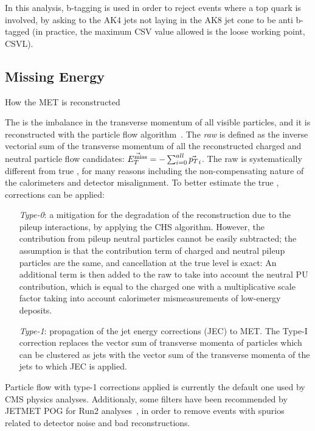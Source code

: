 In this analysis, b-tagging is used in order to reject events where a top quark is involved, by asking to the AK4 jets not laying in the AK8 jet cone to be anti b-tagged (in practice, the maximum CSV value allowed is the loose working point, CSVL).

\subsection{Missing Energy}
{\color{red} How the MET is reconstructed}
 
The \MET is the imbalance in the transverse momentum of all visible particles, and it is reconstructed with the particle flow algorithm~\cite{bib:PF1}. The \emph{raw} \MET is defined as the inverse vectorial sum of the transverse momentum of all the reconstructed charged and neutral particle flow candidates: $\vec{E_T^{\text{miss}}}= - \sum_{i=0}^{all} \vec{p_T}_i$.
The raw \MET is systematically different from true \MET, for many reasons including the non-compensating nature of the calorimeters and detector misalignment. To better estimate the true \MET, corrections can be applied:
\begin{itemize}
   \item[\emph{Type-0}:] a mitigation for the degradation of the \MET reconstruction due to the pileup interactions, by applying the CHS algorithm. However, the \MET contribution from pileup neutral particles cannot be easily subtracted; the assumption is that the \MET contribution term of charged and neutral pileup particles are the same, and cancellation at the true level is exact:%
 An additional \MET term is then added to the raw \MET to take into account the neutral PU contribution, which is equal to the charged one with a multiplicative scale factor taking into account calorimeter mismeasurements of low-\pt energy deposits.
   \item[\emph{Type-1}:] propagation of the jet energy corrections (JEC) to MET. The Type-I correction replaces the vector sum of transverse momenta of particles which can be clustered as jets with the vector sum of the transverse momenta of the jets to which JEC is applied. 
 \end{itemize}
% 
Particle flow \MET with type-1 corrections applied is currently the default one used by CMS physics analyses. Additionaly, some \MET filters have been recommended by JETMET POG for Run2 analyses~\cite{JetMETPOG}, in order to remove events with spurios \MET related to detector noise and bad reconstructions.
